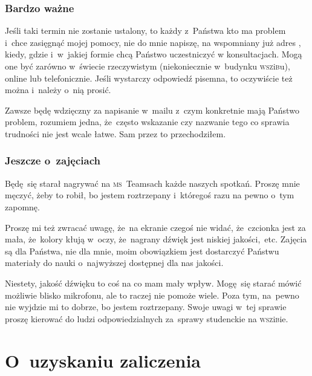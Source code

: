 \documentclass[10pt,t]{beamer}
\begin{document}
\begin{frame}
  \frametitle{Bardzo ważne}


  Jeśli taki termin nie zostanie ustalony, to każdy z~Państwa kto ma
  problem i~chce zasięgnąć mojej pomocy, nie do mnie napiszę, na
  wspomniany już adres \email, kiedy, gdzie i~w~jakiej formie chcą Państwo
  uczestniczyć w konsultacjach. Mogą one być zarówno w~świecie rzeczywistym
  (niekoniecznie w~budynku \textsc{wsz}i\textsc{b}u), online lub
  telefonicznie. Jeśli wystarczy odpowiedź pisemna, to oczywiście
  też można i~należy o~nią prosić.

  Zawsze będę wdzięczny za napisanie w~mailu z~czym konkretnie mają Państwo
  problem, rozumiem jedna, że~często wskazanie czy nazwanie tego co sprawia
  trudności nie jest wcale łatwe. Sam przez to przechodziłem.

\end{frame}





\begin{frame}
  \frametitle{Jeszcze o~zajęciach}


  Będę~się starał nagrywać na \textsc{ms}~Teamsach każde naszych spotkań.
  Proszę mnie męczyć, żeby to robił, bo jestem roztrzepany i~któregoś
  razu na pewno o~tym zapomnę.

  Proszę mi też zwracać uwagę, że~na ekranie czegoś nie widać,
  że~czcionka jest za mała, że~kolory kłują w~oczy, że~nagrany dźwięk
  jest niskiej jakości,~etc. Zajęcia są dla Państwa, nie dla mnie, moim
  obowiązkiem jest dostarczyć Państwu materiały do nauki o~najwyższej
  dostępnej dla nas jakości.

  Niestety, jakość dźwięku to coś na co mam mały wpływ. Mogę~się starać
  mówić możliwie blisko mikrofonu, ale to raczej nie pomoże wiele.
  Poza tym, na~pewno nie wyjdzie mi to dobrze, bo jestem roztrzepany.
  Swoje uwagi w~tej sprawie proszę kierować do ludzi odpowiedzialnych
  za~sprawy studenckie na \textsc{wsz}i\textsc{b}ie.

\end{frame}










\section{O~uzyskaniu zaliczenia}
\end{document}
